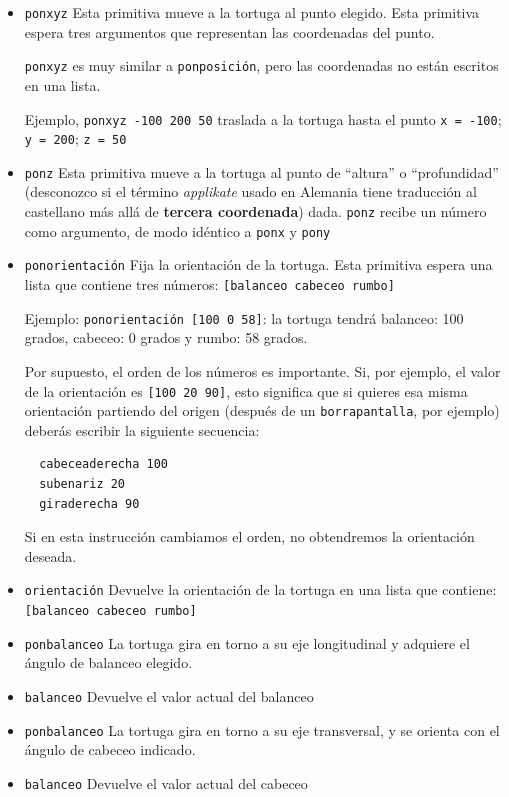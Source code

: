 \begin{itemize}
   \item \texttt{ponxyz}
      Esta primitiva mueve a la tortuga al punto elegido. Esta primitiva
      espera tres argumentos que representan las coordenadas del punto.

      \texttt{ponxyz} es muy similar a \texttt{ponposici\'on}, pero las
      coordenadas no est\'an escritos en una lista.

      Ejemplo, \texttt{ponxyz -100 200 50} traslada a la tortuga hasta el
      punto \texttt{x = -100}; \texttt{y = 200}; \texttt{z = 50}
   \item \texttt{ponz}
      Esta primitiva mueve a la tortuga al punto de ``altura'' o
      ``profundidad'' (desconozco si el t\'ermino \textit{applikate} usado
      en Alemania tiene traducci\'on al castellano m\'as all\'a de
      \textbf{tercera coordenada}) dada.
      \texttt{ponz} recibe un n\'umero como argumento, de modo id\'entico a
      \texttt{ponx} y \texttt{pony}
   \item \texttt{ponorientaci\'on}
      Fija la orientaci\'on de la tortuga. Esta primitiva espera una lista que
      contiene tres n\'umeros: \texttt{[balanceo cabeceo rumbo]}

      Ejemplo: \texttt{ponorientaci\'on [100 0 58]}: la tortuga tendr\'a 
      balanceo: 100 grados, cabeceo: 0 grados y rumbo: 58 grados.

      Por supuesto, el orden de los n\'umeros es importante. Si, por ejemplo,
      el valor de la orientaci\'on es \texttt{[100 20 90]}, esto significa que
      si quieres esa misma orientaci\'on partiendo del origen (despu\'es de un
      \texttt{borrapantalla}, por ejemplo) deber\'as escribir la siguiente
      secuencia:
      \begin{verbatim}
  cabeceaderecha 100
  subenariz 20
  giraderecha 90\end{verbatim}
      Si en esta instrucci\'on cambiamos el orden, no obtendremos la orientaci\'on
      deseada.
   \item \texttt{orientaci\'on}
      Devuelve la orientaci\'on de la tortuga en una lista que contiene:
      \texttt{[balanceo cabeceo rumbo]} 
   \item \texttt{ponbalanceo}
      La tortuga gira en torno a su eje longitudinal y adquiere el \'angulo
      de balanceo elegido.
   \item \texttt{balanceo}
      Devuelve el valor actual del balanceo
   \item \texttt{ponbalanceo} La tortuga
      gira en torno a su eje transversal, y se orienta con el \'angulo de cabeceo
      indicado.
   \item \texttt{balanceo}
      Devuelve el valor actual del cabeceo
\end{itemize}

